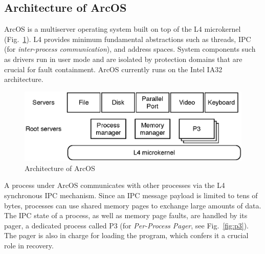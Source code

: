 \documentclass{report}
\begin{document}



\subsection{Architecture of ArcOS}
\label{s:arc}

ArcOS is a multiserver operating system built on top of the L4 microkernel~\cite{L4X2} (Fig.~\ref{fig:arc}).  L4 provides minimum fundamental abstractions such as threads, IPC (for \emph{inter-process communication}), and address spaces. System components such as drivers run in user mode and are isolated by protection domains that are crucial for fault containment. ArcOS currently runs on the Intel IA32 architecture.

\begin{figure}[ht]
\centering
\includegraphics[scale=0.6]{architecture}
\caption{Architecture of ArcOS}
\label{fig:arc}
\end{figure}

A process under ArcOS communicates with other processes via the L4 synchronous IPC mechanism. Since an IPC message payload is limited to tens of bytes, processes can use shared memory pages to exchange large amounts of data. The IPC state of a process, as well as memory page faults, are handled by its pager, a dedicated process called P3 (for \emph{Per-Process Pager}, see Fig.~\ref{fig:p3}). The pager is also in charge for loading the program, which confers it a crucial role in recovery.
\end{document}
